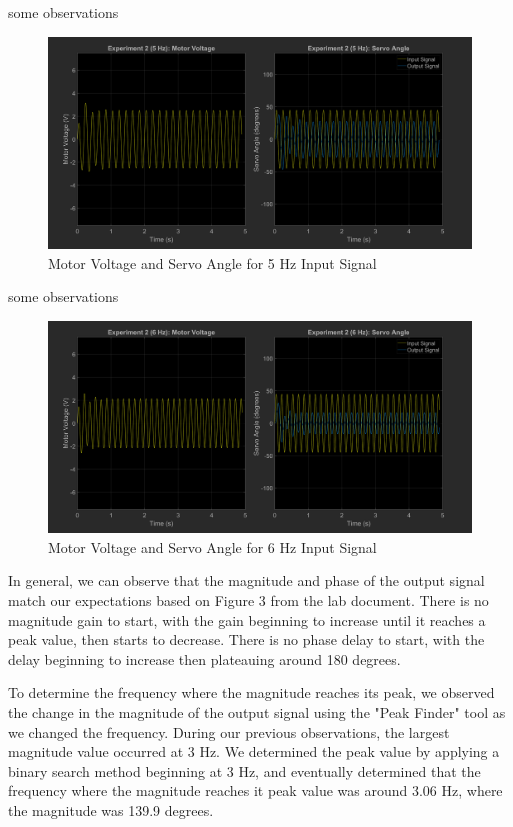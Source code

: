 \documentclass[12pt]{article}
\begin{document}
some observations
\begin{figure}[h!]
    \centering
    \includegraphics[width=\textwidth]{exp2_5}
    \caption{\label{fig:exp2_5}Motor Voltage and Servo Angle for 5 Hz Input Signal}
\end{figure}

some observations
\begin{figure}[h!]
    \centering
    \includegraphics[width=\textwidth]{exp2_6}
    \caption{\label{fig:exp2_6}Motor Voltage and Servo Angle for 6 Hz Input Signal}
\end{figure}

In general, we can observe that the magnitude and phase of the output signal match our expectations based on Figure 3 from the lab document. There is no magnitude gain to start, with the gain beginning to increase until it reaches a peak value, then starts to decrease. There is no phase delay to start, with the delay beginning to increase then plateauing around 180 degrees.

To determine the frequency where the magnitude reaches its peak, we observed the change in the magnitude of the output signal using the "Peak Finder" tool as we changed the frequency. During our previous observations, the largest magnitude value occurred at 3 Hz. We determined the peak value by applying a binary search method beginning at 3 Hz, and eventually determined that the frequency where the magnitude reaches it peak value was around 3.06 Hz, where the magnitude was 139.9 degrees.
\end{document}
